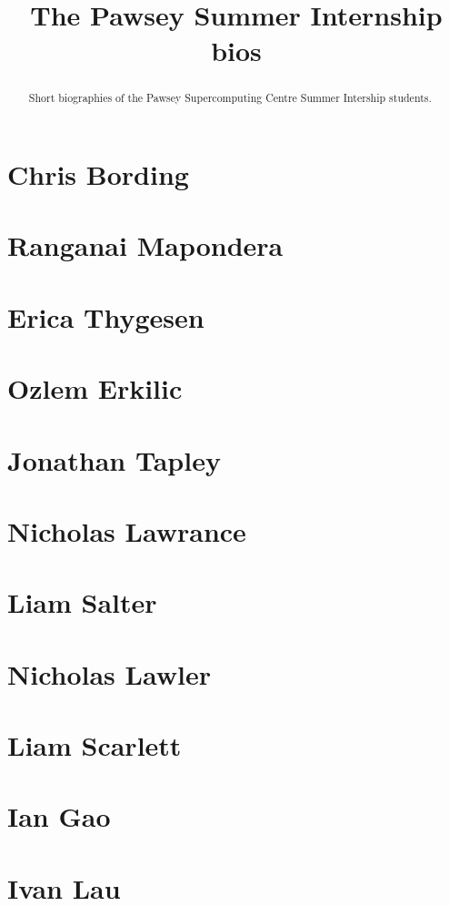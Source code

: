 \documentclass[11pt,a4paper]{report}
\title{The Pawsey Summer Internship bios}
\begin{document}
\maketitle
\tableofcontents


\begin{abstract}

Short biographies of the Pawsey Supercomputing Centre Summer Intership students.

\end{abstract}

\chapter{Chris Bording}



\chapter{Ranganai Mapondera}

\chapter{Erica Thygesen}



\chapter{Ozlem Erkilic}


\chapter{Jonathan Tapley}


\chapter{Nicholas Lawrance}


\chapter{Liam Salter}


\chapter{Nicholas Lawler}


\chapter{Liam Scarlett}


\chapter{Ian Gao}


\chapter{Ivan Lau}

\end{document}
